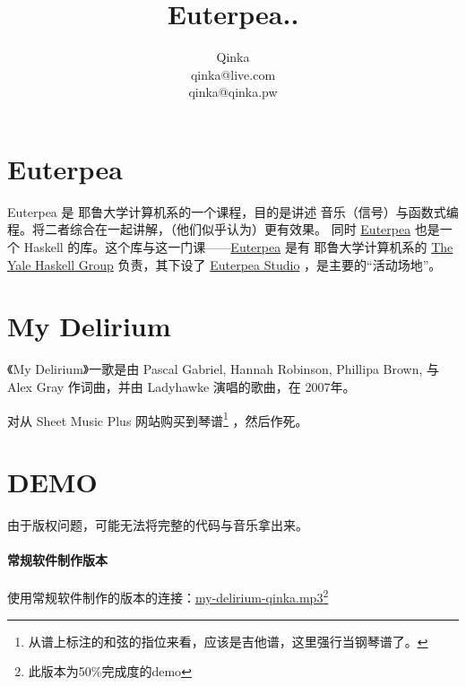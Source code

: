\documentclass{ctexart}
\author{Qinka \\ qinka@live.com \\ qinka@qinka.pw}
\title{Euterpea..}
\begin{document}
\section{Euterpea}

Euterpea 是 耶鲁大学计算机系的一个课程，目的是讲述 音乐（信号）与函数式编程。将二者综合在一起讲解，（他们似乎认为）更有效果。
同时 \href{http://www.euterpea.com}{Euterpea} 也是一个 Haskell 的库。这个库与这一门课——\href{http://haskell.cs.yale.edu/euterpea/}{Euterpea}
是有 耶鲁大学计算机系的 \href{http://haskell.cs.yale.edu}{The Yale Haskell Group} 负责，其下设了
\href{http://haskell.cs.yale.edu/euterpea/euterpea-studio/}{Euterpea Studio} ，是主要的“活动场地”。

\section{My Delirium}

《My Delirium》一歌是由 Pascal Gabriel, Hannah Robinson, Phillipa Brown, 与 Alex Gray 作词曲，并由 Ladyhawke 演唱的歌曲，在 2007年。

对从 Sheet Music Plus 网站购买到琴谱\footnote{从谱上标注的和弦的指位来看，应该是吉他谱，这里强行当钢琴谱了。} ，然后作死。


\section{DEMO}

由于版权问题，可能无法将完整的代码与音乐拿出来。

\paragraph{常规软件制作版本}
使用常规软件制作的版本的连接：\href{/res/music/my-delirium-qinka.mp3}{my-delirium-qinka.mp3}\footnote{此版本为50\%完成度的demo}
\end{document}
